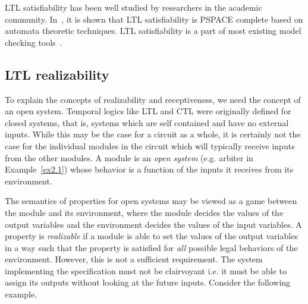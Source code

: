 \noindent
LTL satisfiability has been well studied by researchers in the
academic community. In~\cite{vardi:86}, it is shown that LTL satisfiability
is PSPACE complete based on automata theoretic techniques.
LTL satisfiability is a part of most
existing model checking tools~\cite{forspec, vis, ifv, magellan}.

\subsection{LTL realizability} \label{sec2.2.2}
To explain the concepts of realizability and receptiveness, we need the
concept of an open system. Temporal logics like LTL and CTL were originally
defined for closed systems, that is, systems which are self contained and
have no external inputs. While this may be the case for a circuit as a 
whole, it is certainly not the case for the individual modules in the
circuit which will
typically receive inputs from the other modules. A module is an
{\em open system} (e.g. arbiter in Example~\ref{ex2.1}) whose behavior is a
function of the inputs it receives from its environment.

\noindent
The semantics of properties
for open systems may be viewed as a game between the module and its
environment, where the module decides the values of the output variables and
the environment decides the values of the input variables. A property
is {\em realizable} if a module is able to set the values of the
output variables in a way such that the property is satisfied for {\em all}
possible legal behaviors of the environment. However, this is not a
sufficient requirement. The system implementing the specification must not
be clairvoyant i.e. it must be able to assign its outputs without looking
at the future inputs. Consider the following example. 

